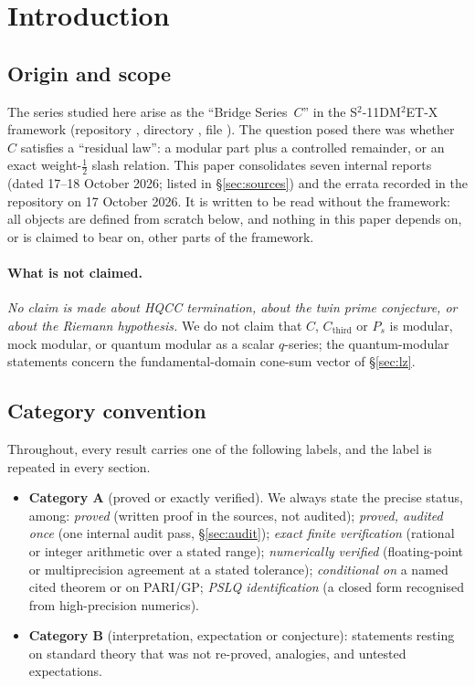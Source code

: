 \documentclass[11pt]{article}
\theoremstyle{definition}
\newcommand{\Cthird}{C_{\mathrm{third}}}
\begin{document}
\tableofcontents

\section{Introduction}

\subsection{Origin and scope}
The series studied here arise as the ``Bridge Series~$C$'' in the S$^2$-11DM$^2$ET-X framework
(repository , directory
, file ).
The question posed there was whether $C$ satisfies a ``residual law'': a modular part plus a controlled
remainder, or an exact weight-$\tfrac12$ slash relation. This paper consolidates seven internal reports
(dated 17--18 October 2026; listed in \S\ref{sec:sources}) and the errata recorded in the repository on
17 October 2026. It is written to be read without the framework: all objects are defined from scratch
below, and nothing in this paper depends on, or is claimed to bear on, other parts of the framework.

\paragraph{What is not claimed.} \emph{No claim is made about HQCC termination, about the twin prime
conjecture, or about the Riemann hypothesis.} We do not claim that $C$, $\Cthird$ or $P_s$ is modular,
mock modular, or quantum modular as a scalar $q$-series; the quantum-modular statements concern the
fundamental-domain cone-sum vector of \S\ref{sec:lz}.

\subsection{Category convention}\label{sec:cat}
Throughout, every result carries one of the following labels, and the label is repeated in every section.
\begin{itemize}[leftmargin=2em]
\item \textbf{Category A} (proved or exactly verified). We always state the precise status, among:
\emph{proved} (written proof in the sources, not audited); \emph{proved, audited once} (one internal audit
pass, \S\ref{sec:audit}); \emph{exact finite verification} (rational or integer arithmetic over a stated
range); \emph{numerically verified} (floating-point or multiprecision agreement at a stated tolerance);
\emph{conditional on} a named cited theorem or on PARI/GP; \emph{PSLQ identification} (a closed form
recognised from high-precision numerics).
\item \textbf{Category B} (interpretation, expectation or conjecture): statements resting on standard
theory that was not re-proved, analogies, and untested expectations.
\end{itemize}
\end{document}
